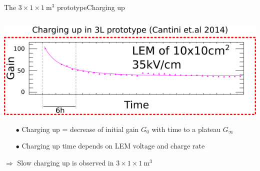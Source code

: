 \documentclass[10pt]{beamer}
\begin{document}
    \begin{frame}{The \texorpdfstring{$3 \times 1 \times \SI{1}{\meter\cubed}$}{311} prototype}{Charging up}
    	\begin{scriptsize}
    		\begin{columns}
    			\begin{column}{0.45\textwidth}
    				\includegraphics[width=\textwidth]{figures/311/3L_charging_up.png}\\
    				\vfill
    				\begin{itemize}
    					\item[$\bullet$] Charging up = decrease of initial gain $G_0$ with time to a plateau $G_{\infty}$
    					\item[$\bullet$] Charging up time depends on LEM voltage and charge rate
    				\end{itemize}
    				$\Rightarrow$ Slow charging up is observed in $3 \times 1 \times \SI{1}{\meter\cubed}$ 

\end{column}
\end{columns}
\end{scriptsize}
\end{frame}
\end{document}

